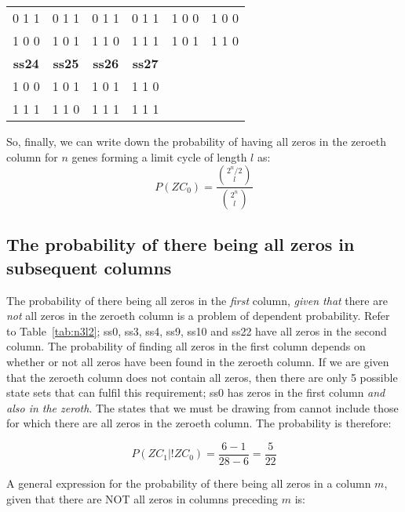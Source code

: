\documentclass[11pt, a4paper]{article}
\begin{document}
\begin{table}[h!]
\begin{center}
\begin{tabular}{c|c|c|c|c|c}
      \hline
      0 1 1       & 0 1 1       & 0 1 1       & 0 1 1       & 1 0 0      & 1 0 0       \\
      1 0 0       & 1 0 1       & 1 1 0       & 1 1 1       & 1 0 1      & 1 1 0       \\
      \hline
      \textbf{ss24} & \textbf{ss25} & \textbf{ss26} & \textbf{ss27} &        &             \\
      \hline
      1 0 0       & 1 0 1       & 1 0 1       & 1 1 0       &            &             \\
      1 1 1       & 1 1 0       & 1 1 1       & 1 1 1       &            &             \\
      \hline
    \end{tabular}
  \end{center}
\end{table}

So, finally, we can write down the probability of having all zeros in
the zeroeth column for $n$ genes forming a limit cycle of length $l$ as:
\begin{equation}
P(ZC_0) = \frac{\binom{2^n/2}{l}}{\binom{2^n}{l}}
\end{equation}

\subsection{The probability of there being all zeros in subsequent columns}

The probability of there being all zeros in the \emph{first}
column, \emph{given that} there are \emph{not} all zeros in the
zeroeth column is a problem of dependent probability. Refer to
Table~\ref{tab:n3l2}; ss0, ss3, ss4, ss9, ss10 and ss22 have all zeros
in the second column. The probability of finding all zeros in the
first column depends on whether or not all zeros have been found in
the zeroeth column. If we are given that the zeroeth column does not
contain all zeros, then there are only 5 possible state sets that can
fulfil this requirement; ss0 has zeros in the first column \emph{and
also in the zeroth}. The states that we must be drawing from cannot
include those for which there are all zeros in the zeroeth column. The
probability is therefore:

\begin{equation}
P(ZC_1|!ZC_0) = \frac{6 -1}{28-6} = \frac{5}{22}
\end{equation}

A general expression for the probability of there being all zeros in a
column $m$, given that there are NOT all zeros in columns preceding
$m$ is:
\end{document}
